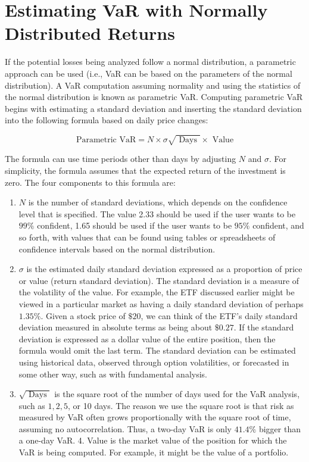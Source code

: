 \documentclass[11pt]{article}
\begin{document}
\section*{Estimating VaR with Normally Distributed Returns}
If the potential losses being analyzed follow a normal distribution, a parametric approach can be used (i.e., VaR can be based on the parameters of the normal distribution). A VaR computation assuming normality and using the statistics of the normal distribution is known as parametric VaR. Computing parametric VaR begins with estimating a standard deviation and inserting the standard deviation into the following formula based on daily price changes:


\begin{equation*}
\text { Parametric } \mathrm{VaR}=N \times \sigma \sqrt{\text { Days }} \times \text { Value } \tag{1}
\end{equation*}


The formula can use time periods other than days by adjusting $N$ and $\sigma$. For simplicity, the formula assumes that the expected return of the investment is zero. The four components to this formula are:

\begin{enumerate}
  \item $N$ is the number of standard deviations, which depends on the confidence level that is specified. The value 2.33 should be used if the user wants to be $99 \%$ confident, 1.65 should be used if the user wants to be $95 \%$ confident, and so forth, with values that can be found using tables or spreadsheets of confidence intervals based on the normal distribution.
  \item $\sigma$ is the estimated daily standard deviation expressed as a proportion of price or value (return standard deviation). The standard deviation is a measure of the volatility of the value. For example, the ETF discussed earlier might be viewed in a particular market as having a daily standard deviation of perhaps $1.35 \%$. Given a stock price of $\$ 20$, we can think of the ETF's daily standard deviation measured in absolute terms as being about $\$ 0.27$. If the standard deviation is expressed as a dollar value of the entire position, then the formula would omit the last term. The standard deviation can be estimated using historical data, observed through option volatilities, or forecasted in some other way, such as with fundamental analysis.
  \item $\sqrt{\text { Days }}$ is the square root of the number of days used for the VaR analysis, such as $1,2,5$, or 10 days. The reason we use the square root is that risk as measured by VaR often grows proportionally with the square root of time, assuming no autocorrelation. Thus, a two-day VaR is only $41.4 \%$ bigger than a one-day VaR. 4. Value is the market value of the position for which the VaR is being computed. For example, it might be the value of a portfolio.
\end{enumerate}
\end{document}
